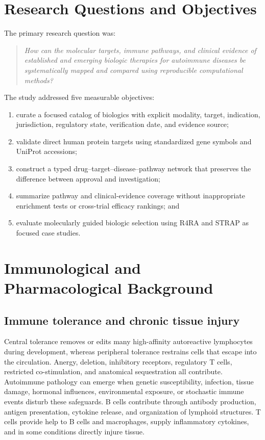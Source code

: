 \documentclass[12pt,a4paper]{article}
\begin{document}
\section{Research Questions and Objectives}
The primary research question was:
\begin{quote}\textit{How can the molecular targets, immune pathways, and clinical evidence of established and emerging biologic therapies for autoimmune diseases be systematically mapped and compared using reproducible computational methods?}\end{quote}
The study addressed five measurable objectives:
\begin{enumerate}
\item curate a focused catalog of biologics with explicit modality, target, indication, jurisdiction, regulatory state, verification date, and evidence source;
\item validate direct human protein targets using standardized gene symbols and UniProt accessions;
\item construct a typed drug--target--disease--pathway network that preserves the difference between approval and investigation;
\item summarize pathway and clinical-evidence coverage without inappropriate enrichment tests or cross-trial efficacy rankings; and
\item evaluate molecularly guided biologic selection using R4RA and STRAP as focused case studies.
\end{enumerate}

\section{Immunological and Pharmacological Background}
\subsection{Immune tolerance and chronic tissue injury}
Central tolerance removes or edits many high-affinity autoreactive lymphocytes during development, whereas peripheral tolerance restrains cells that escape into the circulation. Anergy, deletion, inhibitory receptors, regulatory T cells, restricted co-stimulation, and anatomical sequestration all contribute. Autoimmune pathology can emerge when genetic susceptibility, infection, tissue damage, hormonal influences, environmental exposure, or stochastic immune events disturb these safeguards. B cells contribute through antibody production, antigen presentation, cytokine release, and organization of lymphoid structures. T cells provide help to B cells and macrophages, supply inflammatory cytokines, and in some conditions directly injure tissue.
\end{document}
